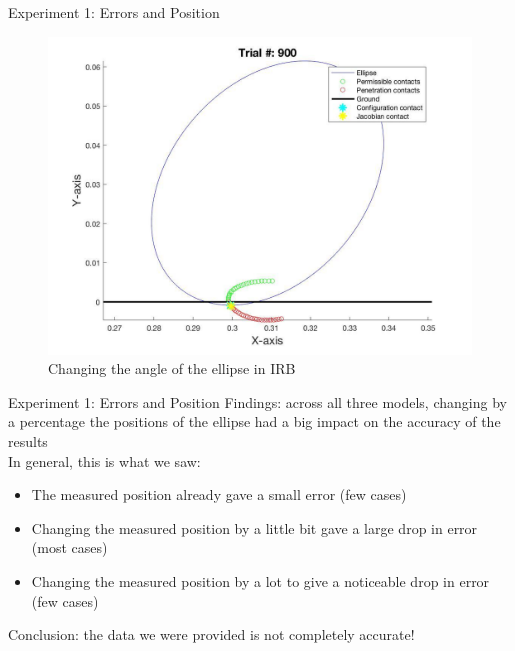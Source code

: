 \begin{frame}{Experiment 1: Errors and Position}
\begin{figure}[!htb]
      \caption{Changing the contact x position in IRB}
      \label{fig:awesome_image3}
    \endminipage\hfill
      \includegraphics[width=\linewidth]{figures/trial900.jpg}
      \caption{Changing the angle of the ellipse in IRB}
      \label{fig:awesome_image2}
    \endminipage
    \end{figure}        
    
\end{frame}

\begin{frame}{Experiment 1: Errors and Position}
Findings: across all three models, changing by a percentage the positions of the ellipse had a big impact on the accuracy of the results \\
\vspace{\baselineskip}
In general, this is what we saw:
    \begin{itemize}
        \item The measured position already gave a small error (few cases)
        \item Changing the measured position by a little bit gave a large drop in error (most cases)
        \item Changing the measured position by a lot to give a noticeable drop in error (few cases)
    \end{itemize} 
\vspace{\baselineskip}
Conclusion: the data we were provided is not completely accurate!

\end{frame}

